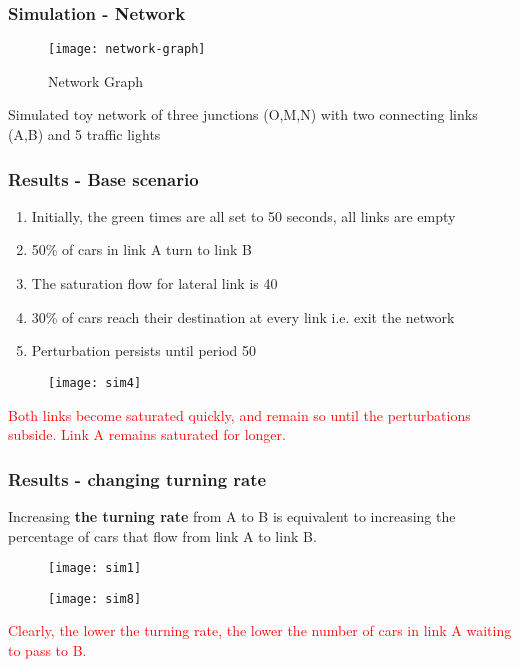 \documentclass{beamer}
\begin{document}
\begin{frame}

\frametitle{Simulation - Network}
\begin{figure}[h!]
    \caption{Network Graph}
      \centering
	\texttt{[image: network-graph]}
\end{figure}
Simulated toy network of three junctions (O,M,N) with two connecting links (A,B) and 5 traffic lights
\end{frame}

\begin{frame}
\frametitle{Results - Base scenario}
\begin{enumerate} \small
\item  Initially, the green times are all set to 50 seconds, all links are empty
\item 50\% of cars in link A turn to link B
\item The saturation flow for lateral link is 40
\item 30\% of cars reach their destination at every link i.e. exit the network
\item Perturbation persists until period 50
 \end{enumerate}

\begin{figure}[h!]
          \centering
	\texttt{[image: sim4]}
\end{figure}
\small
 \textcolor{red}{Both links become saturated quickly, and remain so until the perturbations subside. Link A remains saturated for
longer.}
\end{frame}

\begin{frame}
\frametitle{Results - changing turning rate}
\small
Increasing \textbf{the turning rate} from A to B is equivalent to increasing the percentage of cars that flow from link A to link B. 
\begin{figure}[h!]
          \centering
	\texttt{[image: sim1]}
\end{figure}
\begin{figure}[h!]
          \centering
	\texttt{[image: sim8]}
\end{figure}
\textcolor{red}{Clearly,  the lower the turning rate, the lower the number of cars in link A waiting to pass to B.}

\end{frame}
\end{document}
